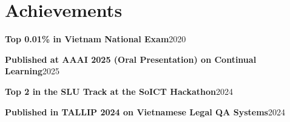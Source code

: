 \section{Achievements}
\resumeSubHeadingListStart

    \resumeProjectHeading
    {\textbf{Top 0.01\% in Vietnam National Exam}}{2020}{}

    \resumeProjectHeading
    {\textbf{Published at AAAI 2025 (Oral Presentation) on Continual Learning}}{2025}{}

    \resumeProjectHeading
    {\textbf{Top 2 in the SLU Track at the SoICT Hackathon}}{2024}{}

    \resumeProjectHeading
    {\textbf{Published in TALLIP 2024 on Vietnamese Legal QA Systems}}{2024}{}

\resumeSubHeadingListEnd